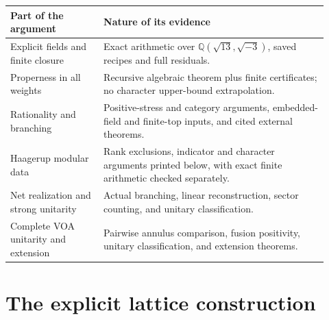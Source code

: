 \documentclass[11pt,a4paper]{article}
\theoremstyle{definition}
\newcommand{\QQ}{\mathbb Q}
\begin{document}
\begin{center}
\begin{tabular}{@{}p{0.27\linewidth}p{0.65\linewidth}@{}}
\toprule
Part of the argument & Nature of its evidence \\
\midrule
Explicit fields and finite closure & Exact arithmetic over
\(\QQ(\sqrt{13},\sqrt{-3})\), saved recipes and full residuals.\\
Properness in all weights & Recursive algebraic theorem plus finite
certificates; no character upper-bound extrapolation.\\
Rationality and branching & Positive-stress and category arguments,
embedded-field and finite-top inputs, and cited external theorems.\\
Haagerup modular data & Rank exclusions, indicator and character
arguments printed below, with exact finite arithmetic checked separately.\\
Net realization and strong unitarity & Actual branching, linear
reconstruction, sector counting, and unitary classification.\\
Complete VOA unitarity and extension & Pairwise annulus comparison,
fusion positivity, unitary classification, and extension theorems.\\
\bottomrule
\end{tabular}
\end{center}

\section{The explicit lattice construction}\label{sec:construction}
\end{document}
